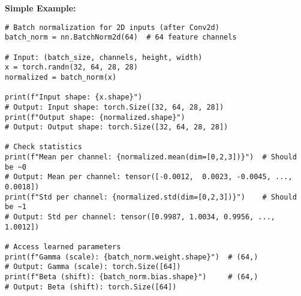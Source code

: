 \documentclass[11pt,a4paper]{book}
\begin{document}
\textbf{Simple Example:}
\begin{verbatim}
# Batch normalization for 2D inputs (after Conv2d)
batch_norm = nn.BatchNorm2d(64)  # 64 feature channels

# Input: (batch_size, channels, height, width)
x = torch.randn(32, 64, 28, 28)
normalized = batch_norm(x)

print(f"Input shape: {x.shape}")
# Output: Input shape: torch.Size([32, 64, 28, 28])
print(f"Output shape: {normalized.shape}")
# Output: Output shape: torch.Size([32, 64, 28, 28])

# Check statistics
print(f"Mean per channel: {normalized.mean(dim=[0,2,3])}")  # Should be ~0
# Output: Mean per channel: tensor([-0.0012,  0.0023, -0.0045, ...,  0.0018])
print(f"Std per channel: {normalized.std(dim=[0,2,3])}")    # Should be ~1
# Output: Std per channel: tensor([0.9987, 1.0034, 0.9956, ..., 1.0012])

# Access learned parameters
print(f"Gamma (scale): {batch_norm.weight.shape}")  # (64,)
# Output: Gamma (scale): torch.Size([64])
print(f"Beta (shift): {batch_norm.bias.shape}")     # (64,)
# Output: Beta (shift): torch.Size([64])
\end{verbatim}
\end{document}
